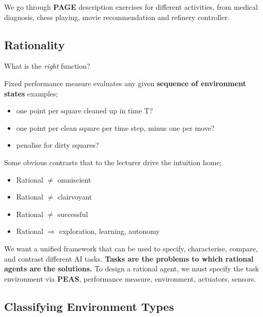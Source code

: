 \documentclass{article}
\begin{document}
We go through \textbf{PAGE} description exercises for different activities, from medical diagnosis, chess playing, movie recommendation and refinery controller.

\subsection{Rationality}
What is the \emph{right} function?

Fixed performance measure evaluates any given \textbf{sequence of environment states} examples;
\begin{itemize}
	\item one point per square cleaned up in time T?
	\item one point per clean square per time step, minus one per move?
	\item penalise for dirty squares?
\end{itemize}

Some obvious contrasts that to the lecturer drive the intuition home;
\begin{itemize}
	\item Rational $\neq$ omniscient
	\item Rational $\neq$ clairvoyant
	\item Rational $\neq$ successful
	\item Rational $\Rightarrow$ exploration, learning, autonomy
\end{itemize}

We want a unified framework that can be used to specify, characterise, compare, and contrast different AI tasks. \textbf{Tasks are the problems to which rational agents are the solutions.} To design a rational agent, we must specify the task environment via \textbf{PEAS}, performance measure, environment, actuators, sensors.

\subsection{Classifying Environment Types}
\end{document}
